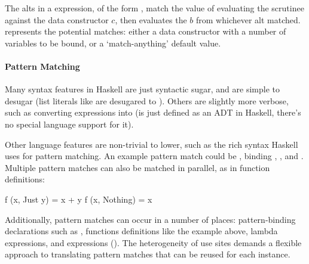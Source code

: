 \documentclass[dissertation.tex]{subfiles}
\begin{document}
{{{{                
            
                The alts in a  expression, of the form , match the value of
                evaluating the scrutinee against the data constructor \(c\), then evaluates the \(b\) from whichever alt
                matched.  represents the potential matches: either a data constructor with a
                number of variables to be bound, or a `match-anything' default value.

            }
            \paragraph*{Pattern Matching}
            {

                Many syntax features in Haskell are just syntactic sugar, and are simple to desugar (list literals like
                \haskell{[1, 2]} are desugared to ). Others are slightly more verbose, such as converting  expressions into 
                (is just defined as an ADT in Haskell, there's no special language support for it).

                Other language features are non-trivial to lower, such as the rich syntax Haskell uses for pattern
                matching. An example pattern match could be , binding , , and . Multiple pattern matches can also be matched in
                parallel, as in function definitions:

                \begin{haskellfigure}
                f (x, Just y) = x + y
                f (x, Nothing) = x
                \end{haskellfigure}

                Additionally, pattern matches can occur in a number of places: pattern-binding declarations such as
                , functions definitions like the example above, lambda expressions, and
                 expressions (). The
                heterogeneity of use sites demands a flexible approach to translating pattern matches that can be reused
                for each instance.

}}}}
\end{document}
